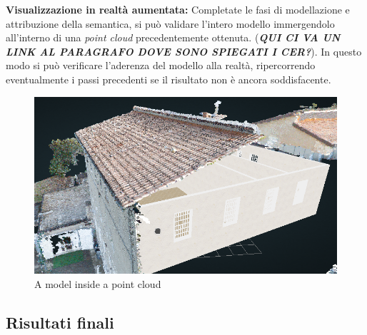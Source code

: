 \noindent \textbf{Visualizzazione in realt\`a aumentata:} Completate le fasi di modellazione e attribuzione della semantica, si pu\`o validare l'intero modello immergendolo all'interno di una \textit{point cloud} precedentemente ottenuta. (\textbf{\textit{QUI CI VA UN LINK AL PARAGRAFO DOVE SONO SPIEGATI I CER?}}). In questo modo si pu\`o verificare l'aderenza del modello alla realt\`a, ripercorrendo eventualmente i passi precedenti se il risultato non \`e ancora soddisfacente.\\

\begin{figure}[htbp] %
   \centering
   \includegraphics[width=1\linewidth]{images/augmented}
   \caption{A model inside a point cloud}
   \label{fig:augmented}
\end{figure}

\subsection{Risultati finali}

